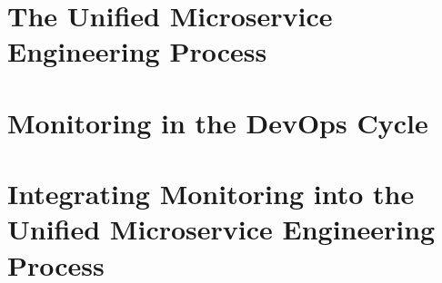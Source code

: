 



\section{The Unified Microservice Engineering Process}


\section{Monitoring in the DevOps Cycle}


\section{Integrating Monitoring into the Unified Microservice Engineering Process}

